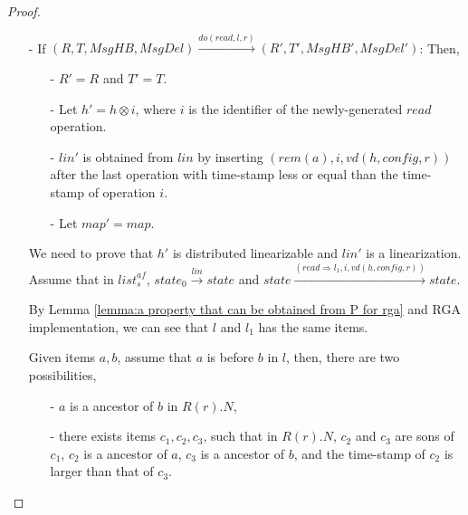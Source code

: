 {\begin {proof}
\begin{itemize}
    It is obvious that $C_4$ holds for message $\mathit{mid}$. By Lemma \ref{lemma:a property that can be obtained from P for rga}, the construction of $R'(r)$, and $C_4$ holds for message $\mathit{mid}$, we can see that $R'(r) = \mathit{apply}(\mathit{lin}',\mathit{vd}(h',\mathit{del}',r))$.


\item[-] If $(R,T,\mathit{MsgHB},\mathit{MsgDel}) {\xrightarrow{\mathit{do}(\mathit{read},l,r)}} (R',T',\mathit{MsgHB}',\mathit{MsgDel}')$: Then,

    \begin{itemize}
    \setlength{\itemsep}{0.5pt}
    \item[-] $R' = R$ and $T' = T$.

    \item[-] Let $h' = h \otimes i$, where $i$ is the identifier of the newly-generated $\mathit{read}$ operation.

    \item[-] $\mathit{lin}'$ is obtained from $\mathit{lin}$ by inserting $(\mathit{rem}(a),i,\mathit{vd}(h,\mathit{config},r))$ after the last operation with time-stamp less or equal than the time-stamp of operation $i$.

    \item[-] Let $\mathit{map}' = \mathit{map}$.
    \end{itemize}

    We need to prove that $h'$ is distributed linearizable and $\mathit{lin}'$ is a linearization. Assume that in $\mathit{list}_s^{\mathit{af}}$, $\mathit{state}_0 {\xrightarrow{\mathit{lin}}} \mathit{state}$ and $\mathit{state} {\xrightarrow{ (\mathit{read} \Rightarrow l_1, i, \mathit{vd}(h,\mathit{config},r) ) }} \mathit{state}$.

    By Lemma \ref{lemma:a property that can be obtained from P for rga} and RGA implementation, we can see that $l$ and $l_1$ has the same items.

    Given items $a,b$, assume that $a$ is before $b$ in $l$, then, there are two possibilities,

    \begin{itemize}
    \setlength{\itemsep}{0.5pt}
    \item[-] $a$ is a ancestor of $b$ in $R(r).N$,

    \item[-] there exists items $c_1,c_2,c_3$, such that in $R(r).N$, $c_2$ and $c_3$ are sons of $c_1$, $c_2$ is a ancestor of $a$, $c_3$ is a ancestor of $b$, and the time-stamp of $c_2$ is larger than that of $c_3$.
    \end{itemize}


\end{itemize}
\end{proof}}
